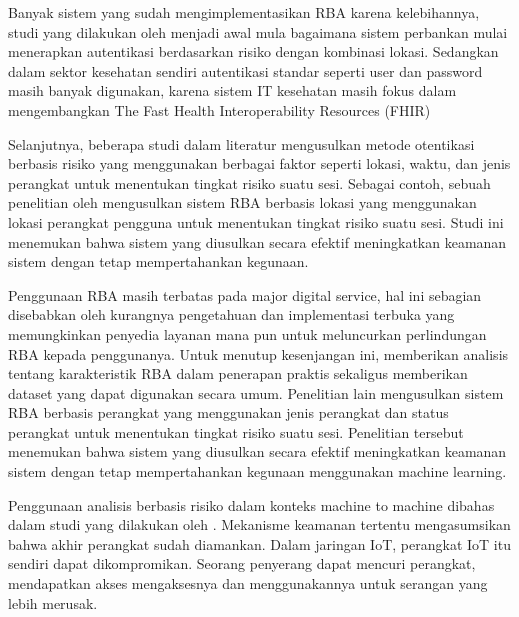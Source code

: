 Banyak sistem yang sudah mengimplementasikan RBA karena kelebihannya,
studi yang dilakukan oleh \cite{prasad_study_2017} menjadi awal mula bagaimana sistem
perbankan mulai menerapkan autentikasi berdasarkan risiko dengan kombinasi
lokasi. Sedangkan dalam sektor kesehatan sendiri autentikasi standar seperti user
dan password masih banyak digunakan, karena sistem IT kesehatan masih fokus
dalam mengembangkan The Fast Health Interoperability Resources (FHIR) \cite{ayaz_correction_2021}

Selanjutnya, beberapa studi dalam literatur mengusulkan metode otentikasi
berbasis risiko yang menggunakan berbagai faktor seperti lokasi, waktu, dan jenis
perangkat untuk menentukan tingkat risiko suatu sesi. Sebagai contoh, sebuah
penelitian oleh \cite{agarwal_ask_2016} mengusulkan sistem RBA berbasis lokasi yang
menggunakan lokasi perangkat pengguna untuk menentukan tingkat risiko suatu
sesi. Studi ini menemukan bahwa sistem yang diusulkan secara efektif
meningkatkan keamanan sistem dengan tetap mempertahankan kegunaan.

Penggunaan RBA masih terbatas pada major digital service, hal ini sebagian
disebabkan oleh kurangnya pengetahuan dan implementasi terbuka yang
memungkinkan penyedia layanan mana pun untuk meluncurkan perlindungan RBA
kepada penggunanya. Untuk menutup kesenjangan ini, \cite{stephan_wiefling_whats_2021}
memberikan analisis tentang karakteristik RBA dalam penerapan praktis
sekaligus memberikan dataset yang dapat digunakan secara umum.
Penelitian lain \cite{misbahuddin_design_2017} mengusulkan sistem RBA berbasis
perangkat yang menggunakan jenis perangkat dan status perangkat untuk
menentukan tingkat risiko suatu sesi. Penelitian tersebut menemukan bahwa sistem
yang diusulkan secara efektif meningkatkan keamanan sistem dengan tetap
mempertahankan kegunaan menggunakan machine learning.

Penggunaan analisis berbasis risiko dalam konteks machine to machine dibahas
dalam studi yang dilakukan oleh \cite{taneja_analytics_2013}. Mekanisme keamanan tertentu
mengasumsikan bahwa akhir perangkat sudah diamankan. Dalam jaringan IoT,
perangkat IoT itu sendiri dapat dikompromikan. Seorang penyerang dapat mencuri
perangkat, mendapatkan akses mengaksesnya dan menggunakannya untuk
serangan yang lebih merusak.

